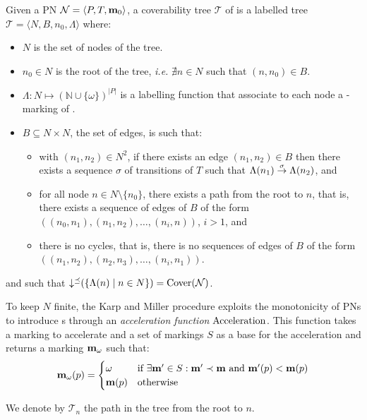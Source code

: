 \begin{defi}
  Given a \ac{PN} $\mathcal{N} = \langle P,T, \mathbf{m}_0\rangle$, a coverability tree $\mathcal{T}$ of \tupleN is a labelled tree $\mathcal{T} = \langle N, B, n_0, \Lambda\rangle$ where:
  \begin{itemize}
    \item $N$ is the set of nodes of the tree.%
    \item $n_0 \in N$ is the root of the tree, \textit{i.e.} $\nexists n \in N$ such that $(n, n_0) \in B$.
    \item $\Lambda : N \mapsto (\mathbb{N} \cup \{\omega\})^{|P|}$ is a labelling function that associate to each node a \textomega-marking of \tupleN.
    \item $B \subseteq N \times N$, the set of edges, is such that:
      \begin{itemize}
        \item with $(n_1, n_2) \in N^2$, if there exists an edge $(n_1, n_2) \in B$ then there exists a sequence $\sigma$ of transitions of $T$ such that $\Lambda(n_1) \stackrel{\sigma}{\to} \Lambda(n_2)$, and
        \item for all node $n \in N \setminus \{n_0\}$, there exists a path from the root to $n$, that is, there exists a sequence of edges of $B$ of the form $((n_0, n_1), (n_1, n_2), \dots, (n_{i}, n))$, $i > 1$, and
        \item there is no cycles, that is, there is no sequences of edges of $B$ of the form $((n_1, n_2), (n_2, n_3), \dots, (n_i, n_1))$.
      \end{itemize}
  \end{itemize}
  and such that $\operatorname{\downarrow^\preceq}(\{\Lambda(n) \mid n \in N\}) = \operatorname{Cover}(\mathcal{N})$.
\end{defi}

To keep $N$ finite, the Karp and Miller procedure exploits the monotonicity of \acp{PN} to introduce \omark{}s through an \emph{acceleration function} $\operatorname{Acceleration}$.
This function takes a marking \marq to accelerate and a set of markings $S$ as a base  for the acceleration and returns a marking $\mathbf{m}_\omega$ such that:
\[
  \mathbf{m}_\omega(p) = 
  \begin{cases}
    \omega    &\text{if } \exists \mathbf{m'} \in S : \mathbf{m'} \prec \mathbf{m} \text{ and } \mathbf{m'}(p) < \mathbf{m}(p) \\
    \mathbf{m}(p)  &\text{otherwise}
  \end{cases}
\]

We denote by $\mathscr{T}_n$ the path in the tree from the root to $n$.

